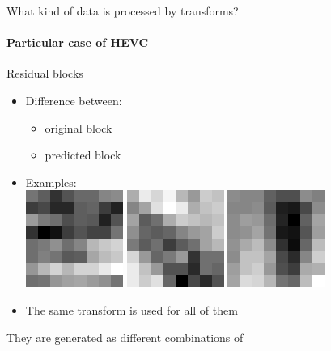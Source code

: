 \documentclass[10pt]{beamer} %
\begin{document}
\begin{frame}{What kind of data is processed by transforms?}
	\framesubtitle{Particular case of HEVC}
	\begin{minipage}{0.38\textwidth}
		\begin{block}{Residual blocks}
			\begin{itemize}
				\item Difference between:
					\begin{itemize}
						\item original block
						\item predicted block
					\end{itemize}
				\item Examples:\\[0.5em]
					\includegraphics[width=0.25\textwidth]{./figures/res_ipm10.png}
					\hfill
					\includegraphics[width=0.25\textwidth]{./figures/res_ipm18.png}
					\hfill
					\includegraphics[width=0.25\textwidth]{./figures/res_ipm26.png}
				\item The same transform is used for all of them
			\end{itemize}
		\end{block}
	\end{minipage}
	\hfill
	\begin{minipage}{0.58\textwidth}
		\begin{block}{They are generated as different combinations of}
			\begin{itemize}

\end{itemize}
\end{block}
\end{minipage}
\end{frame}
\end{document}
